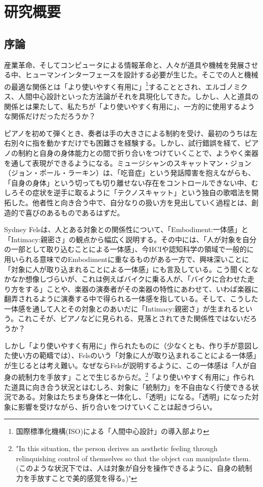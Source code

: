 \chapter{研究概要}
\label{introduction}

\section{序論}

産業革命、そしてコンピュータによる情報革命と、人々が道具や機械を発展させる中、ヒューマンインターフェースを設計する必要が生じた。そこでの人と機械の最適な関係とは「より使いやすく有用に」\footnote{国際標準化機構(ISO)による「人間中心設計」の導入部\cite{hcd}より}することとされ、エルゴノミクス、人間中心設計といった方法論がそれを具現化してきた。しかし、人と道具の関係とは果たして、私たちが「より使いやすく有用に」、一方的に使用するような関係だけだっただろうか？

ピアノを初めて弾くとき、奏者は手の大きさによる制約を受け、最初のうちは左右別々に指を動かすだけでも困難さを経験する。しかし、試行錯誤を経て、ピアノの制約と自身の身体能力との間で折り合いをつけていくことで、ようやく楽器を通して表現ができるようになる。ミュージシャンのスキャットマン・ジョン（ジョン・ポール・ラーキン）は、「吃音症」という発話障害を抱えながらも、「自身の身体」という切っても切り離せない存在をコントロールできない中、むしろその症状を逆手に取るように「テクノスキャット」という独自の歌唱法を開拓した。他者性と向き合う中で、自分なりの扱い方を見出していく過程とは、創造的で喜びのあるものであるはずだ。

Sydney Felsは、人とある対象との関係性について、「Embodiment:一体感」と「Intimacy:親密さ」の観点から幅広く説明する。その中には、「人が対象を自分の一部として取り込むことによる一体感」、今HCIや認知科学の領域で一般的に用いられる意味でのEmbodimentに重なるものがある一方で、興味深いことに「対象に人が取り込まれることによる一体感」にも言及している。こう聞くとなかなか想像しづらいが、これは例えばバイクに乗る人が、「バイクに合わせた走り方をする」ことや、楽器の演奏者がその楽器の特性にあわせて、いわば楽器に翻弄されるように演奏する中で得られる一体感を指している。そして、こうした一体感を通して人とその対象とのあいだに「Intimacy:親密さ」が生まれるという。これこそが、ピアノなどに見られる、見落とされてきた関係性ではないだろうか？

しかし「より使いやすく有用に」作られたものに（少なくとも、作り手が意図した使い方の範疇では）、Felsのいう「対象に人が取り込まれることによる一体感」が生じるとは考え難い。なぜならFelsが説明するように、この一体感は「人が自身の統制力を手放す」ことで生じるからだ。\footnote{"In this situation, the person derives an aesthetic feeling through relinquishing control of themselves so that the object can manipulate them.(このような状況下では、人は対象が自分を操作できるように、自身の統制力を手放すことで美的感覚を得る。)\cite{Fels}"}「より使いやすく有用に」作られた道具に向き合う状況とはむしろ、対象に「統制力」を不自由なく行使できる状況である。対象はたちまち身体と一体化し、「透明」になる。「透明」になった対象に影響を受けながら、折り合いをつけていくことは起きづらい。

